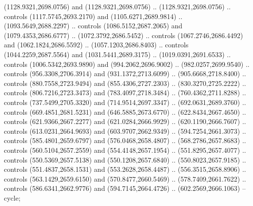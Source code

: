 \begin{scope}[shift={(296.85925,-6.26562)}]
\begin{scope}[shift={(-138.30846,-2572.6617)}]
\begin{scope}
        (1128.9321,2698.0756) and (1128.9321,2698.0756) .. (1128.9321,2698.0756) ..
        controls (1117.5745,2693.2170) and (1105.6271,2689.9814) ..
        (1093.5649,2688.2297) .. controls (1086.5152,2687.2065) and
        (1079.4353,2686.6777) .. (1072.3792,2686.5452) .. controls
        (1067.2746,2686.4492) and (1062.1824,2686.5592) .. (1057.1203,2686.8403) ..
        controls (1044.2259,2687.5564) and (1031.5441,2689.3175) ..
        (1019.0391,2691.6533) .. controls (1006.5342,2693.9890) and
        (994.2062,2696.9002) .. (982.0257,2699.9540) .. controls (956.3308,2706.3914)
        and (931.1372,2713.6099) .. (905.6668,2718.8400) .. controls
        (880.7558,2723.9494) and (855.4306,2727.2303) .. (830.3270,2725.2222) ..
        controls (806.7216,2723.3473) and (783.4097,2718.3484) .. (760.4362,2711.8288)
        .. controls (737.5499,2705.3320) and (714.9514,2697.3347) ..
        (692.0631,2689.3760) .. controls (669.4851,2681.5231) and (646.5885,2673.6770)
        .. (622.8434,2667.4650) .. controls (621.9366,2667.2277) and
        (621.0284,2666.9929) .. (620.1190,2666.7607) .. controls (613.0231,2664.9693)
        and (603.9707,2662.9349) .. (594.7254,2661.3073) .. controls
        (585.4801,2659.6797) and (576.0468,2658.4807) .. (568.2786,2657.8683) ..
        controls (560.5104,2657.2559) and (554.4148,2657.1954) .. (551.8295,2657.4077)
        .. controls (550.5369,2657.5138) and (550.1208,2657.6840) ..
        (550.8023,2657.9185) .. controls (551.4837,2658.1531) and (553.2628,2658.4487)
        .. (556.3515,2658.8906) .. controls (563.1429,2659.6150) and
        (570.8477,2660.5469) .. (578.7409,2661.7622) .. controls (586.6341,2662.9776)
        and (594.7145,2664.4726) .. (602.2569,2666.1063) -- cycle;


\end{scope}
\end{scope}
\end{scope}
